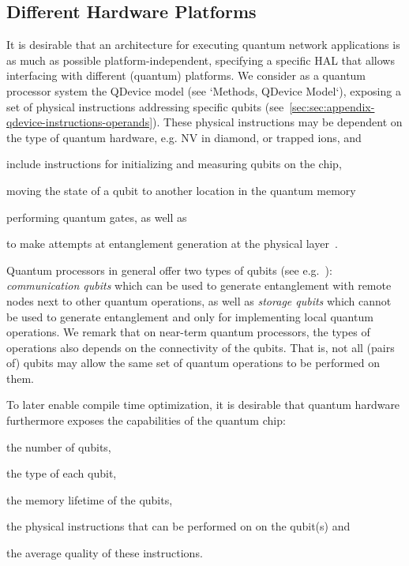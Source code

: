 \subsection{Different Hardware Platforms} 

It is desirable that an architecture for executing quantum network applications is as much as possible platform-independent, specifying a specific \ac{HAL} that allows interfacing with different (quantum) platforms. We consider as a quantum processor system the \ac{QDevice} model (see `Methods, QDevice Model`), exposing a set of physical instructions addressing specific qubits (see~\cref{sec:sec:appendix-qdevice-instructions-operands}). These physical instructions may be dependent on the type of quantum hardware, e.g. NV in diamond, or trapped ions, and
%
\begin{inlinelist}
\item include instructions for initializing and measuring qubits on the chip,
\item moving the state of a qubit to another location in the quantum memory
\item performing quantum gates, as well as
\item to make attempts at entanglement generation at the physical layer~\cite{pompili_2022_experimental}.
\end{inlinelist}

Quantum processors in general offer two types of qubits (see e.g.~\cite{dahlberg_2019_egp}): \emph{communication qubits} which can be used to generate entanglement with remote nodes next to other quantum operations, as well as \emph{storage qubits} which cannot be used to generate entanglement and only for implementing local quantum operations. We remark that on near-term quantum processors, the types of operations also depends on the connectivity of the qubits. That is, not all (pairs of) qubits may allow the same set of quantum operations to be performed on them.

To later enable compile time optimization, it is desirable that quantum hardware furthermore exposes the capabilities of the quantum chip:
%
\begin{inlinelist}
\item the number of qubits,
\item the type of each qubit, 
\item the memory lifetime of the qubits,
\item the physical instructions that can be performed on on the qubit(s) and
\item the average quality of these instructions.
\end{inlinelist}

